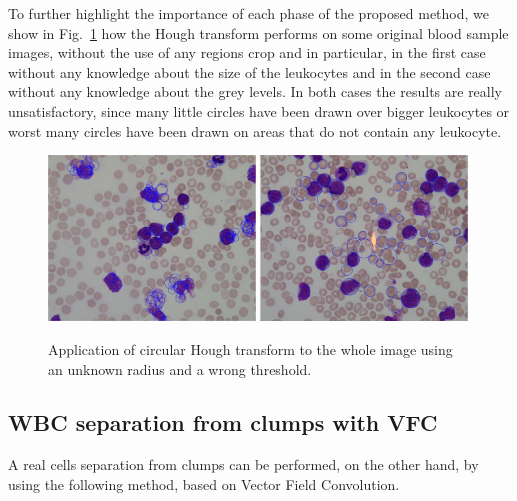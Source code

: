 {	To further highlight the importance of each phase of the proposed method, we show in Fig.~\ref{fig:ex10} how the Hough transform performs on some original blood sample images, without the use of any regions crop and in particular, in the first case without any knowledge about the size of the leukocytes and in the second case without any knowledge about the grey levels. In both cases the results are really unsatisfactory, since many little circles have been drawn over bigger leukocytes or worst many circles have been drawn on areas that do not contain any leukocyte. 
	\begin{figure}[!t]
		\centering
		\includegraphics[width=0.49\textwidth]{images/2016_1_mva/wrongradius}
		\includegraphics[width=0.49\textwidth]{images/2016_1_mva/wrongthreshold}
		\caption[Circular Hough Transform application.]{\label{fig:ex10}Application of circular Hough transform to the whole image using an unknown radius and a wrong threshold.}
	\end{figure}
	
	\subsection{WBC separation from clumps with VFC}
	A real cells separation from clumps can be performed, on the other hand, by using the following method, based on Vector Field Convolution.
	
}
